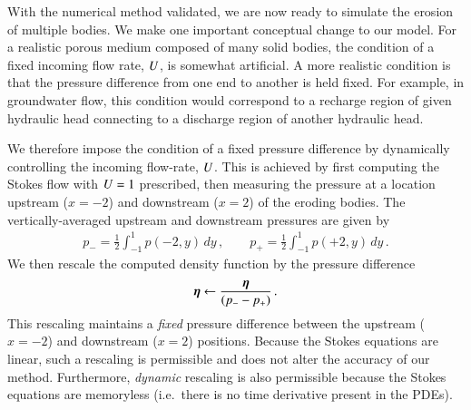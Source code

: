 \documentclass[preprint, 10pt]{elsarticle}
\begin{document}
With the numerical method validated, we are now ready to simulate the erosion of multiple bodies. We make one important conceptual change to our model. For a realistic porous medium composed of many solid bodies, the condition of a fixed incoming flow rate, $U$, is somewhat artificial. A more realistic condition is that the pressure difference from one end to another is held fixed. For example, in groundwater flow, this condition would correspond to a recharge region of given hydraulic head connecting to a discharge region of another hydraulic head. 

We therefore impose the condition of a fixed pressure difference by dynamically controlling the incoming flow-rate, $U$. This is achieved by first computing the Stokes flow with $U = 1$ prescribed, then measuring the pressure at a location upstream ($x = -2$) and downstream ($x=2$) of the eroding bodies. The vertically-averaged upstream and downstream pressures are given by
\begin{align}
p_{-} = \frac{1}{2} \int_{-1}^{1} p(-2,y) \, dy \, , \qquad
p_{+} = \frac{1}{2} \int_{-1}^{1} p(+2,y) \, dy \, .
\end{align}
We then rescale the computed density function by the pressure difference
\begin{align}
{\boldsymbol\eta} \leftarrow \frac{{\boldsymbol\eta}}{(p_{-} - p_{+})} \, .
\end{align}
This rescaling maintains a {\em fixed} pressure difference between the upstream ($x=-2$) and downstream ($x=2$) positions. Because the Stokes equations are linear, such a rescaling is permissible and does not alter the accuracy of our method. Furthermore, {\em dynamic} rescaling is also permissible because the Stokes equations are memoryless (i.e.~there is no time derivative present in the PDEs).
\end{document}
